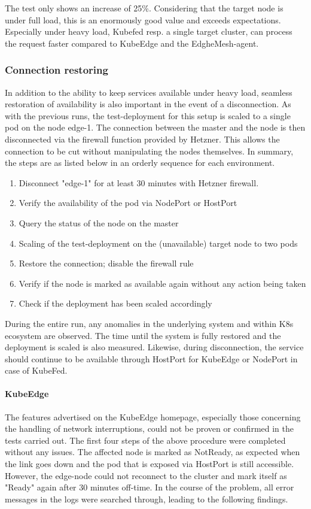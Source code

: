 \documentclass[MSC,Master,english]{twbook}%
\begin{document}
The test only shows an increase of 25\%. Considering that the target node is under full load, this is an enormously good value and exceeds expectations. Especially under heavy load, Kubefed resp. a single target cluster, can process the request faster compared to KubeEdge and the EdgheMesh-agent.

\subsubsection{Connection restoring}
In addition to the ability to keep services available under heavy load, seamless restoration of availability is also important in the event of a disconnection. As with the previous runs, the test-deployment for this setup is scaled to a single pod on the node edge-1. The connection between the master and the node is then disconnected via the firewall function provided by Hetzner. This allows the connection to be cut without manipulating the nodes themselves. In summary, the steps are as listed below in an orderly sequence for each environment.
\begin{enumerate}
    \itemsep0em
    \item Disconnect "edge-1" for at least 30 minutes with Hetzner firewall.
    \item Verify the availability of the pod via NodePort or HostPort
    \item Query the status of the node on the master
    \item Scaling of the test-deployment on the (unavailable) target node to two pods
    \item Restore the connection; disable the firewall rule
    \item Verify if the node is marked as available again without any action being taken
    \item Check if the deployment has been scaled accordingly
\end{enumerate}

During the entire run, any anomalies in the underlying system and within \ac{K8s} ecosystem are observed. The time until the system is fully restored and the deployment is scaled is also measured. Likewise, during disconnection, the service should continue to be available through HostPort for KubeEdge or NodePort in case of KubeFed. 

\paragraph{KubeEdge} The features advertised on the KubeEdge homepage, especially those concerning the handling of network interruptions, could not be proven or confirmed in the tests carried out. The first four steps of the above procedure were completed without any issues. The affected node is marked as NotReady, as expected when the link goes down and the pod that is exposed via HostPort is still accessible. However, the edge-node could not reconnect to the cluster and mark itself as "Ready" again after 30 minutes off-time. In the course of the problem, all error messages in the logs were searched through, leading to the following findings. \par
\end{document}
